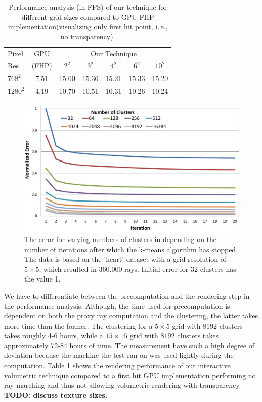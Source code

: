 \documentclass[review,journal]{vgtc}         %
\begin{document}
\begin{table}[b]
  \caption{Performance analysis (in FPS) of our technique for different grid sizes compared to GPU FHP implementation(visualizing only first hit point, i.\,e., no transparency).}
  \label{tab:performance}
  \begin{center}
    \begin{tabular}{|l|c|c|c|c|c|c|}
      \hline
      Pixel & GPU & \multicolumn{5}{c|}{Our Technique}\\
      Res & (FHP) & $2^2$ & $3^2$ & $4^2$ & $6^2$ & $10^2$ \\
      \hline
      $768^2$ & 7.51 & 15.60 & 15.36 & 15.21 & 15.33 & 15.20\\
      $1280^2$ & 4.19 & 10.70 & 10.51 & 10.31 & 10.26 & 10.24\\
      \hline
    \end{tabular}
  \end{center}
\end{table}

\begin{figure}[t]
    \centering 
    \includegraphics[width=0.85\linewidth]{figures/diagram_num_clusters.pdf}
    \caption{The error for varying numbers of clusters in depending on the number of iterations after which the k-means algorithm has stopped. The data is based on the 'heart' dataset with a grid resolution of $5\times5$, which resulted in 360.000 rays. Initial error for 32 clusters has the value 1.}
    \label{fig:clusteringerror}
\end{figure}

We have to differentiate between the precomputation and the rendering step in the performance analysis. Although, the time used for precomputation is dependent on both the proxy ray computation and the clustering, the latter takes more time than the former. The clustering for a $5\times5$ grid with $8192$ clusters takes roughly 4-6 hours, while a $15\times15$ grid with $8192$ clusters takes approximately 72-84 hours of time. The measurement have such a high degree of deviation because the machine the test ran on was used lightly during the computation. Table \ref{tab:performance} shows the rendering performance of our interactive volumetric technique compared to a first hit GPU implementation performing no ray marching and thus not allowing volumetric rendering with transparency. \textbf{TODO: discuss texture sizes.}
\end{document}
